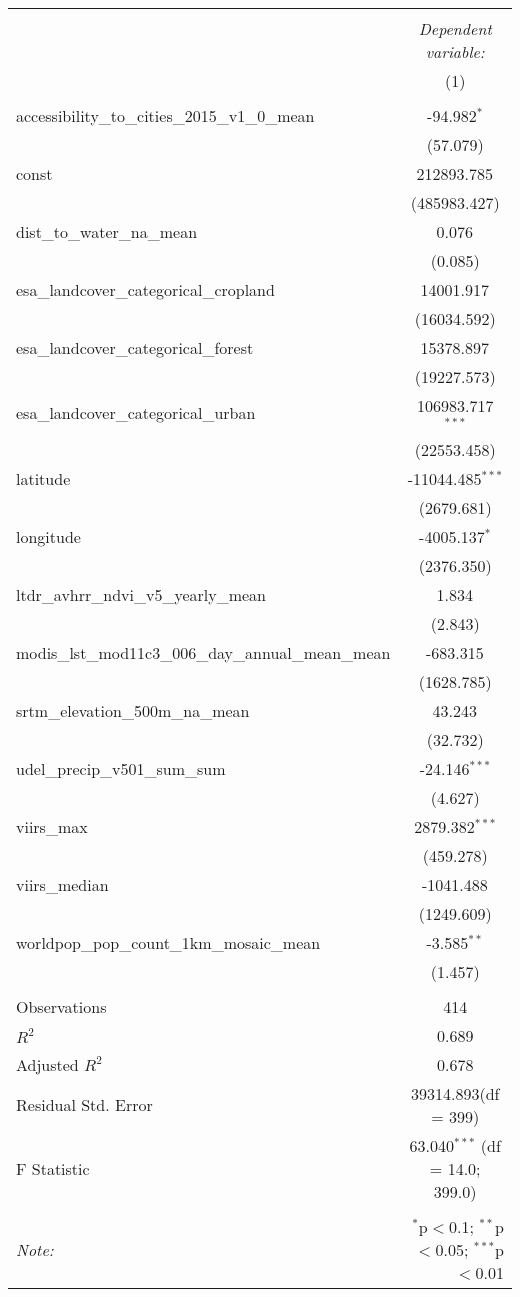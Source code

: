 \begin{table}[!htbp] \centering
\begin{tabular}{@{\extracolsep{5pt}}lc}
\\[-1.8ex]\hline
\hline \\[-1.8ex]
& \multicolumn{1}{c}{\textit{Dependent variable:}} \
\cr \cline{1-2}
\\[-1.8ex] & (1) \\
\hline \\[-1.8ex]
 accessibility_to_cities_2015_v1_0_mean & -94.982$^{*}$ \\
  & (57.079) \\
 const & 212893.785$^{}$ \\
  & (485983.427) \\
 dist_to_water_na_mean & 0.076$^{}$ \\
  & (0.085) \\
 esa_landcover_categorical_cropland & 14001.917$^{}$ \\
  & (16034.592) \\
 esa_landcover_categorical_forest & 15378.897$^{}$ \\
  & (19227.573) \\
 esa_landcover_categorical_urban & 106983.717$^{***}$ \\
  & (22553.458) \\
 latitude & -11044.485$^{***}$ \\
  & (2679.681) \\
 longitude & -4005.137$^{*}$ \\
  & (2376.350) \\
 ltdr_avhrr_ndvi_v5_yearly_mean & 1.834$^{}$ \\
  & (2.843) \\
 modis_lst_mod11c3_006_day_annual_mean_mean & -683.315$^{}$ \\
  & (1628.785) \\
 srtm_elevation_500m_na_mean & 43.243$^{}$ \\
  & (32.732) \\
 udel_precip_v501_sum_sum & -24.146$^{***}$ \\
  & (4.627) \\
 viirs_max & 2879.382$^{***}$ \\
  & (459.278) \\
 viirs_median & -1041.488$^{}$ \\
  & (1249.609) \\
 worldpop_pop_count_1km_mosaic_mean & -3.585$^{**}$ \\
  & (1.457) \\
\hline \\[-1.8ex]
 Observations & 414 \\
 $R^2$ & 0.689 \\
 Adjusted $R^2$ & 0.678 \\
 Residual Std. Error & 39314.893(df = 399)  \\
 F Statistic & 63.040$^{***}$ (df = 14.0; 399.0) \\
\hline
\hline \\[-1.8ex]
\textit{Note:} & \multicolumn{1}{r}{$^{*}$p$<$0.1; $^{**}$p$<$0.05; $^{***}$p$<$0.01} \\
\end{tabular}
\end{table}